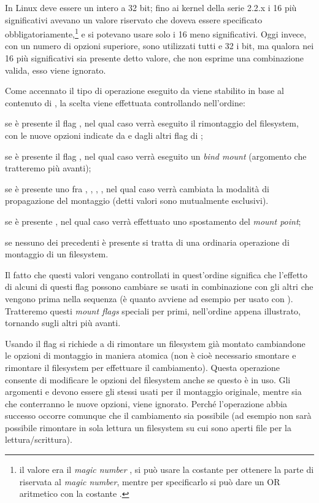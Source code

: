 In Linux  deve essere un intero a 32 bit;
fino ai kernel della serie 2.2.x i 16 più significativi avevano un valore
riservato che doveva essere specificato obbligatoriamente,\footnote{il valore
  era il \textit{magic number} , si può usare la costante
   per ottenere la parte di  riservata
  al \textit{magic number}, mentre per specificarlo si può dare un OR
  aritmetico con la costante .} e si potevano usare solo
i 16 meno significativi. Oggi invece, con un numero di opzioni superiore, sono
utilizzati tutti e 32 i bit, ma qualora nei 16 più significativi sia presente
detto valore, che non esprime una combinazione valida, esso viene ignorato.

Come accennato il tipo di operazione eseguito da  viene stabilito
in base al contenuto di , la scelta viene effettuata
controllando nell'ordine:
\begin{enumerate*}
\item se è presente il flag , nel qual caso verrà eseguito
  il rimontaggio del filesystem, con le nuove opzioni indicate da 
  e dagli altri flag di ;
\item se è presente il flag , nel qual caso verrà eseguito un
  \textit{bind mount} (argomento che tratteremo più avanti);
\item se è presente uno fra , ,
  , , nel qual caso verrà cambiata la
  modalità di propagazione del montaggio (detti valori sono mutualmente
  esclusivi).
\item se è presente , nel qual caso verrà effettuato uno
  spostamento del \textit{mount point};
\item se nessuno dei precedenti è presente si tratta di una ordinaria
  operazione di montaggio di un filesystem.
\end{enumerate*}

Il fatto che questi valori vengano controllati in quest'ordine significa che
l'effetto di alcuni di questi flag possono cambiare se usati in combinazione
con gli altri che vengono prima nella sequenza (è quanto avviene ad esempio
per  usato con ). Tratteremo questi
\textit{mount flags} speciali per primi, nell'ordine appena illustrato,
tornando sugli altri più avanti.

Usando il flag  si richiede a  di rimontare un
filesystem già montato cambiandone le opzioni di montaggio in maniera atomica
(non è cioè necessario smontare e rimontare il filesystem per effettuare il
cambiamento). Questa operazione consente di modificare le opzioni del
filesystem anche se questo è in uso. Gli argomenti  e
 devono essere gli stessi usati per il montaggio originale,
mentre sia  che  conterranno le nuove opzioni,
 viene ignorato.  Perché l'operazione abbia successo
occorre comunque che il cambiamento sia possibile (ad esempio non sarà
possibile rimontare in sola lettura un filesystem su cui sono aperti file per
la lettura/scrittura).

